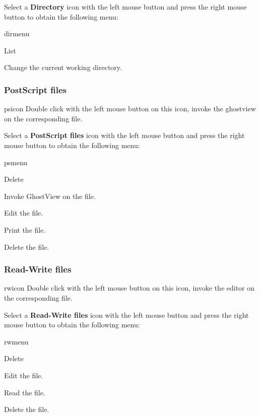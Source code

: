 Select a {\bf Directory} icon with the left mouse button and press
the right mouse button to obtain the following menu:

\begin{PAWf}{dirmenu}
\begin{DLsf}{List}
\item[List] Change the current working directory.
\end{DLsf}
\end{PAWf}

\subsubsection{PostScript files}
\begin{ICON}{psicon}
Double click with the left mouse button on this icon, invoke the ghostview
on the corresponding file.
\end{ICON}

Select a {\bf PostScript files} icon with the left mouse button and press
the right mouse button to obtain the following menu:

\begin{PAWf}{psmenu}
\begin{DLsf}{Delete}
\item[View]         Invoke GhostView on the file.
\item[Edit]         Edit the file.
\item[Print]        Print the file.
\item[Delete]       Delete the file.
\end{DLsf}
\end{PAWf}

\subsubsection{Read-Write files}
\begin{ICON}{rwicon}
Double click with the left mouse button on this icon, invoke the editor on the
corresponding file.
\end{ICON}

Select a {\bf Read-Write files} icon with the left mouse button and press
the right mouse button to obtain the following menu:

\begin{PAWf}{rwmenu}
\begin{DLsf}{Delete}
\item[Edit]         Edit the file.
\item[View]         Read the file.
\item[Delete]       Delete the file.
\end{DLsf}
\end{PAWf}

